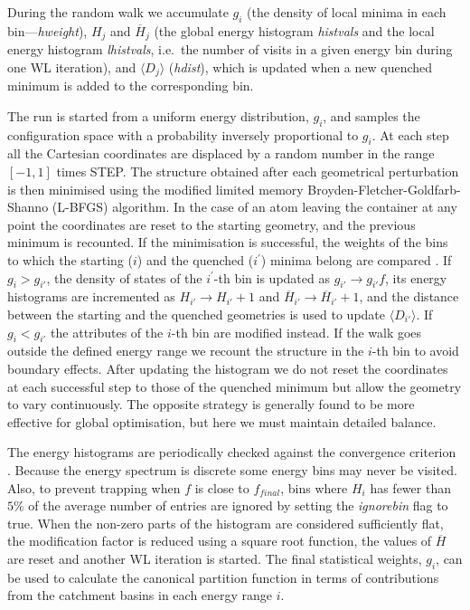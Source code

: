 During the random walk we accumulate
$g_i$ (the density of local minima in each bin---{\it hweight}), 
$H_j$ and $\overline{H}_j$ (the global energy histogram {\it histvals} and the
local energy histogram {\it lhistvals}, i.e.~the
number of visits in a given energy bin during one WL iteration), 
and $\langle D_j\rangle$ ({\it hdist}), which is updated when a new quenched minimum is added
to the corresponding bin. 

The run is started from a uniform energy distribution, $g_i$, 
and samples the configuration space with a probability inversely
proportional to $g_i$.
At each step all the Cartesian coordinates are displaced by a random number in the
range $[-1,1]$ times STEP.
The structure obtained after each geometrical perturbation is then minimised
using the modified limited memory Broyden-Fletcher-Goldfarb-Shanno (L-BFGS) algorithm\cite{lbfgs}. 
In the case of an atom leaving the container at any point the coordinates are 
reset to the starting geometry, and the previous minimum is recounted.  If the
minimisation is successful, the weights of the bins to which the starting ($i$) 
and the quenched ($i^\prime$) minima belong are compared . If
$g_i > g_{i'}$, the density of states of the
$i^\prime$-th bin is updated as $g_{i'} \rightarrow g_{i'} f$,
its energy histograms are incremented as  
$H_{i'} \rightarrow H_{i'} +1$ and $\overline{H}_{i'} \rightarrow \overline{H}_{i'} +1$, and the distance
between the starting and the quenched geometries is used to update $\langle D_{i'}\rangle$.
If $g_i < g_{i'}$  the attributes of the  $i$-th bin are modified instead. 
If the walk goes outside the defined energy range
we recount the structure in the $i$-th bin to avoid boundary effects.  After updating the histogram
we do not reset the coordinates at each successful step to those of the quenched minimum 
but allow the geometry to vary
continuously. The opposite strategy is generally found to be more effective for global optimisation, 
but here we must maintain detailed balance.

The energy histograms are periodically checked against the convergence criterion . 
Because the energy spectrum is discrete some energy bins may never be visited.  
Also, to prevent trapping when $f$ is close to
$f_{final}$,  bins where $H_i$ has fewer than $5 \%$ of the average number of entries are 
ignored by setting the {\it ignorebin} flag
to true. When the non-zero parts of the
histogram are considered sufficiently flat,
the modification factor is reduced using
a square root function, the values of $\overline{H}$ are reset and another WL iteration is started. 
The final statistical weights, $g_i$, can be used to calculate the canonical partition function in 
terms of contributions from the catchment basins in each energy range $i$.  

